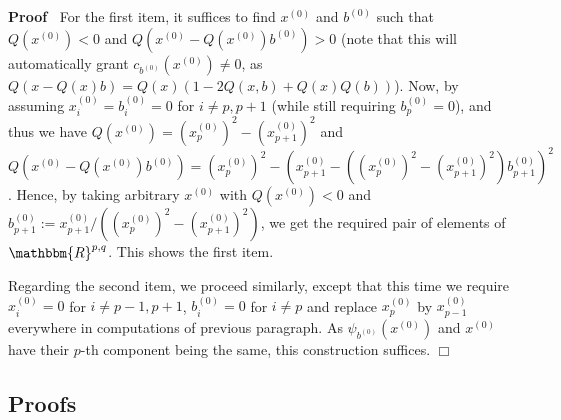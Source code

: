 \documentclass[12pt]{article}
\newcommand{\assign}{:=}
\renewenvironment{proof}{\noindent\textbf{Proof\ }}{\hspace*{\fill}$\Box$\medskip}
\theoremstyle{remark}
\begin{document}
\begin{proof}
  For the first item, it suffices to find $x^{(0)}$ and $b^{(0)}$ such that $Q
  (x^{(0)}) < 0$ and $Q (x^{(0)} - Q (x^{(0)}) b^{(0)}) > 0$ (note that this
  will automatically grant $c_{b^{(0)}} (x^{(0)}) \neq 0$, as $Q (x - Q (x) b)
  = Q (x) (1 - 2 Q (x, b) + Q (x) Q (b))$). Now, by assuming $x_i^{(0)} =
  b^{(0)}_i = 0$ for $i \neq p, p + 1$ (while still requiring $b_p^{(0)} =
  0$), and thus we have $Q (x^{(0)}) = (x_p^{(0)})^2 - (x_{p + 1}^{(0)})^2$
  and $Q (x^{(0)} - Q (x^{(0)}) b^{(0)}) = (x_p^{(0)})^2 - (x_{p + 1}^{(0)} -
  ((x_p^{(0)})^2 - (x_{p + 1}^{(0)})^2) b^{(0)}_{p + 1})^2$. Hence, by taking
  arbitrary $x^{(0)}$ with $Q (x^{(0)}) < 0$ and $b_{p + 1}^{(0)} \assign x_{p
  + 1}^{(0)} / ((x_p^{(0)})^2 - (x_{p + 1}^{(0)})^2)$, we get the required
  pair of elements of $\mathbbm{R}^{p, q}$. This shows the first item.
  
  Regarding the second item, we proceed similarly, except that this time we
  require $x_i^{(0)} = 0$ for $i \neq p - 1, p + 1$, $b^{(0)}_i = 0$ for $i
  \neq p$ and replace $x_p^{(0)}$ by $x_{p - 1}^{(0)}$ everywhere in
  computations of previous paragraph. As $\psi_{b^{(0)}} (x^{(0)})$ and
  $x^{(0)}$ have their $p$-th component being the same, this construction
  suffices.
\end{proof}

\subsection{Proofs}
\end{document}
